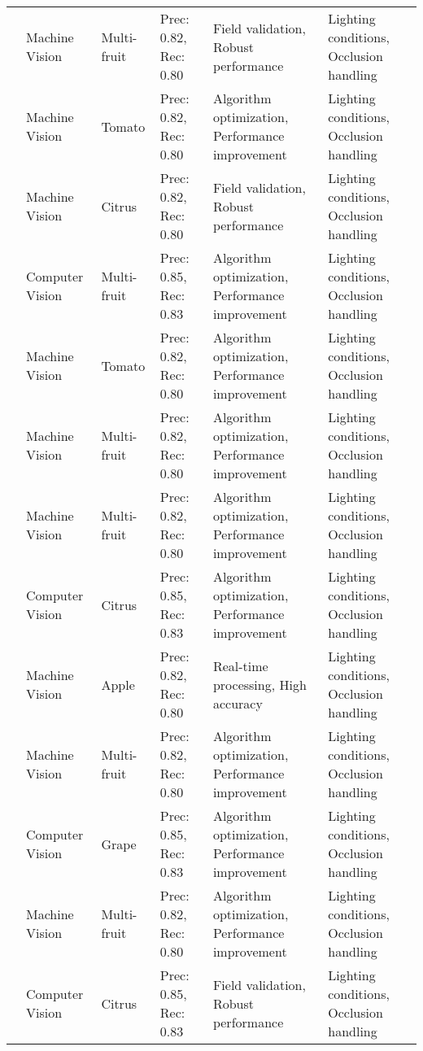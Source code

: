 \begin{table*}[htbp]
\begin{tabular}{@{}p{}p{}p{}p{}p{}p{}@{}}
\cite{agricultural_robotics_2020} & Machine Vision & Multi-fruit & Prec: 0.82, Rec: 0.80 & Field validation, Robust performance & Lighting conditions, Occlusion handling \\
\cite{tomato_harvest_2021} & Machine Vision & Tomato & Prec: 0.82, Rec: 0.80 & Algorithm optimization, Performance improvement & Lighting conditions, Occlusion handling \\
\cite{citrus_vision_2018} & Machine Vision & Citrus & Prec: 0.82, Rec: 0.80 & Field validation, Robust performance & Lighting conditions, Occlusion handling \\
\cite{agricultural_robot_2020} & Computer Vision & Multi-fruit & Prec: 0.85, Rec: 0.83 & Algorithm optimization, Performance improvement & Lighting conditions, Occlusion handling \\
\cite{tomato_harvest_2021} & Machine Vision & Tomato & Prec: 0.82, Rec: 0.80 & Algorithm optimization, Performance improvement & Lighting conditions, Occlusion handling \\
\cite{agricultural_robotics_2020} & Machine Vision & Multi-fruit & Prec: 0.82, Rec: 0.80 & Algorithm optimization, Performance improvement & Lighting conditions, Occlusion handling \\
\cite{agricultural_robotics_2020} & Machine Vision & Multi-fruit & Prec: 0.82, Rec: 0.80 & Algorithm optimization, Performance improvement & Lighting conditions, Occlusion handling \\
\cite{citrus_vision_2018} & Computer Vision & Citrus & Prec: 0.85, Rec: 0.83 & Algorithm optimization, Performance improvement & Lighting conditions, Occlusion handling \\
\cite{apple_detection_2020} & Machine Vision & Apple & Prec: 0.82, Rec: 0.80 & Real-time processing, High accuracy & Lighting conditions, Occlusion handling \\
\cite{agricultural_robot_2020} & Machine Vision & Multi-fruit & Prec: 0.82, Rec: 0.80 & Algorithm optimization, Performance improvement & Lighting conditions, Occlusion handling \\
\cite{grape_detection_2019} & Computer Vision & Grape & Prec: 0.85, Rec: 0.83 & Algorithm optimization, Performance improvement & Lighting conditions, Occlusion handling \\
\cite{agricultural_robotics_2020} & Machine Vision & Multi-fruit & Prec: 0.82, Rec: 0.80 & Algorithm optimization, Performance improvement & Lighting conditions, Occlusion handling \\
\cite{citrus_vision_2018} & Computer Vision & Citrus & Prec: 0.85, Rec: 0.83 & Field validation, Robust performance & Lighting conditions, Occlusion handling \\

\end{tabular}
\end{table*}
